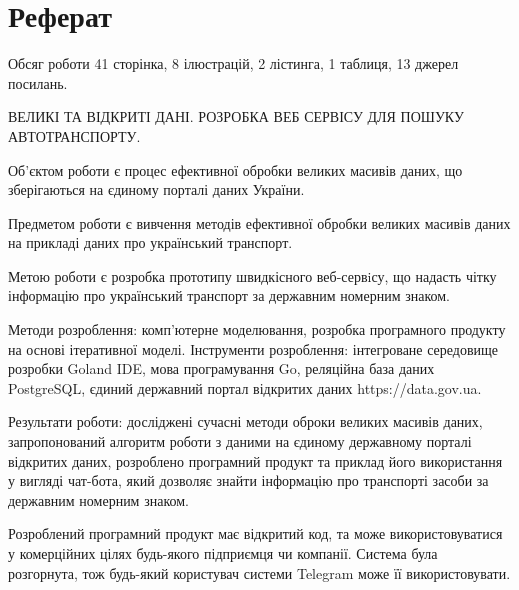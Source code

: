 \chapter*{Реферат}
Обсяг роботи 41 сторінка, 8 ілюстрацій, 2 лістинга, 1 таблиця, 13 джерел посилань.

ВЕЛИКІ ТА ВІДКРИТІ ДАНІ. РОЗРОБКА ВЕБ СЕРВІСУ ДЛЯ ПОШУКУ АВТОТРАНСПОРТУ.

Об'єктом роботи є процес ефективної обробки великих масивів даних,
що зберігаються на єдиному порталі даних України.

Предметом роботи є вивчення методів ефективної обробки
великих масивів даних на прикладі даних про український транспорт.

Метою роботи є розробка прототипу швидкісного веб-сервiсу,
що надасть чітку інформацію про український транспорт за
державним номерним знаком.

Методи розроблення: комп'ютерне моделювання, розробка програмного продукту на основі ітеративної
моделі.
Інструменти розроблення: інтегроване середовище розробки Goland IDE,
мова програмування Go, реляційна  база даних PostgreSQL, єдиний державний портал відкритих даних https://data.gov.ua.

Результати роботи: досліджені сучасні методи оброки великих масивів даних,
запропонований алгоритм роботи з даними на єдиному державному порталі відкритих даних,
розроблено програмний продукт та приклад його використання у вигляді чат-бота,
який дозволяє знайти інформацію про транспорті засоби за державним номерним знаком.

Розроблений програмний продукт має відкритий код,
та може використовуватися у комерційних цілях будь-якого підприємця чи компанії.
Система була розгорнута, тож будь-який користувач системи Telegram може її використовувати.

